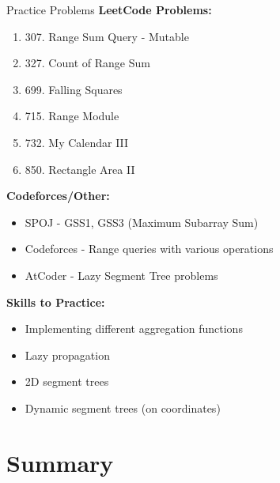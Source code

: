\documentclass[aspectratio=169]{beamer}
\begin{document}
\begin{frame}{Practice Problems}
  \textbf{LeetCode Problems:}
  \begin{enumerate}
    \item 307. Range Sum Query - Mutable
    \item 327. Count of Range Sum
    \item 699. Falling Squares
    \item 715. Range Module
    \item 732. My Calendar III
    \item 850. Rectangle Area II
  \end{enumerate}

  \vspace{0.5cm}
  \textbf{Codeforces/Other:}
  \begin{itemize}
    \item SPOJ - GSS1, GSS3 (Maximum Subarray Sum)
    \item Codeforces - Range queries with various operations
    \item AtCoder - Lazy Segment Tree problems
  \end{itemize}

  \vspace{0.5cm}
  \textbf{Skills to Practice:}
  \begin{itemize}
    \item Implementing different aggregation functions
    \item Lazy propagation
    \item 2D segment trees
    \item Dynamic segment trees (on coordinates)
  \end{itemize}
\end{frame}

\section{Summary}
\end{document}
